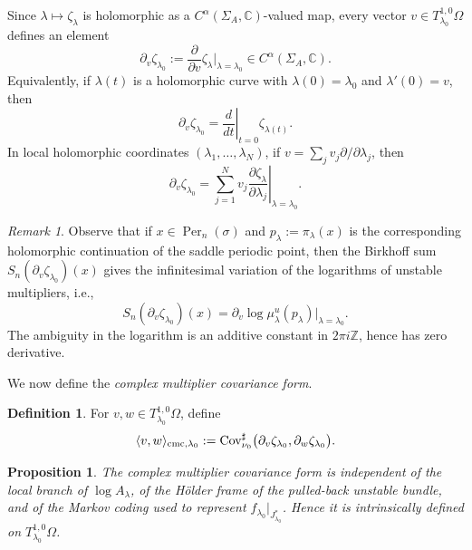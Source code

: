 \documentclass[11pt]{amsart}
\theoremstyle{plain}
\newtheorem{prop}[thm]{Proposition}
\theoremstyle{definition}
\newtheorem{defn}[thm]{Definition}
\theoremstyle{remark}
\newtheorem{rmk}[thm]{Remark}
\begin{document}
Since $\lambda\mapsto\zeta_\lambda$ is holomorphic as a
$C^\alpha(\Sigma_A,\mathbb C)$-valued map, every vector
$v\in T^{1,0}_{\lambda_0}\Omega$ defines an element
$$
\partial_v\zeta_{\lambda_0}:=
\frac{\partial}{\partial v}\zeta_\lambda \Big|_{\lambda=\lambda_0}
\in C^\alpha(\Sigma_A,\mathbb C).$$
Equivalently, if $\lambda(t)$ is a holomorphic curve with
$\lambda(0)=\lambda_0$ and $\lambda'(0)=v$, then
$$
  \partial_v\zeta_{\lambda_0}
  =
  \left.\frac{d}{dt}\right|_{t=0}\zeta_{\lambda(t)} .
$$
In local holomorphic coordinates $(\lambda_1,\ldots,\lambda_N)$, if
$v=\sum_j v_j\partial/\partial\lambda_j$, then
$$
  \partial_v\zeta_{\lambda_0}
  =
  \sum_{j=1}^N v_j
  \left.\frac{\partial\zeta_\lambda}{\partial\lambda_j}
  \right|_{\lambda=\lambda_0}.
$$

\begin{rmk}\label{r:per-sn}
Observe that if $x\in\operatorname{Per}_n(\sigma)$ and
$p_\lambda:=\pi_\lambda(x)$
is the corresponding holomorphic continuation of the saddle periodic point,
then the Birkhoff sum $S_n(\partial_v\zeta_{\lambda_0})(x)$ gives the infinitesimal variation of the logarithms of unstable multipliers, i.e.,
$$
S_n(\partial_v\zeta_{\lambda_0})(x) = \partial_v\log \mu^u_\lambda(p_\lambda) \big|_{\lambda=\lambda_0}.
$$
The ambiguity in the logarithm is an additive constant in
$2\pi i\mathbb Z$, hence has zero derivative.
\end{rmk}

We now define the {\it complex multiplier covariance form}.

\begin{defn}\label{def:cmc}
For $v,w\in T^{1,0}_{\lambda_0}\Omega$, define
$$
\langle v,w\rangle_{\rm cmc,\lambda_0} := \operatorname{Cov}^{\sharp}_{\nu_0}\bigl(\partial_v\zeta_{\lambda_0},   \partial_w\zeta_{\lambda_0}\bigr). 
$$
\end{defn}


\begin{prop}
The complex multiplier covariance form is independent of the local
branch of $\log A_\lambda$, of the Hölder frame of the pulled-back
unstable bundle, and of the Markov coding used to represent
$f_{\lambda_0}|_{J^\ast_{\lambda_0}}$. Hence it is intrinsically defined on
$T^{1,0}_{\lambda_0}\Omega$.
\end{prop}
\end{document}
